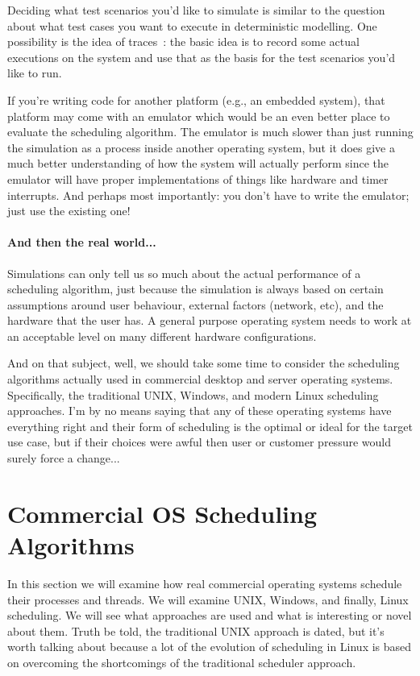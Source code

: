 Deciding what test scenarios you'd like to simulate is similar to the question about what test cases you want to execute in deterministic modelling. One possibility is the idea of traces~\cite{osc}: the basic idea is to record some actual executions on the system and use that as the basis for the test scenarios you'd like to run.

If you're writing code for another platform (e.g., an embedded system), that platform may come with an emulator which would be an even better place to evaluate the scheduling algorithm. The emulator is much slower than just running the simulation as a process inside another operating system, but it does give a much better understanding of how the system will actually perform since the emulator will have proper implementations of things like hardware and timer interrupts. And perhaps most importantly: you don't have to write the emulator; just use the existing one!

\paragraph{And then the real world...}
Simulations can only tell us so much about the actual performance of a scheduling algorithm, just because the simulation is always based on certain assumptions around user behaviour, external factors (network, etc), and the hardware that the user has. A general purpose operating system needs to work at an acceptable level on many different hardware configurations. 

And on that subject, well, we should take some time to consider the scheduling algorithms actually used in commercial desktop and server operating systems. Specifically, the traditional UNIX, Windows, and modern Linux scheduling approaches. I'm by no means saying that any of these operating systems have everything right and their form of scheduling is the optimal or ideal for the target use case, but if their choices were awful then user or customer pressure would surely force a change...

\section*{Commercial OS Scheduling Algorithms}

In this section we will examine how real commercial operating systems schedule their processes and threads. We will examine UNIX, Windows, and finally, Linux scheduling. We will see what approaches are used and what is interesting or novel about them. Truth be told, the traditional UNIX approach is dated, but it's worth talking about because a lot of the evolution of scheduling in Linux is based on overcoming the shortcomings of the traditional scheduler approach.


